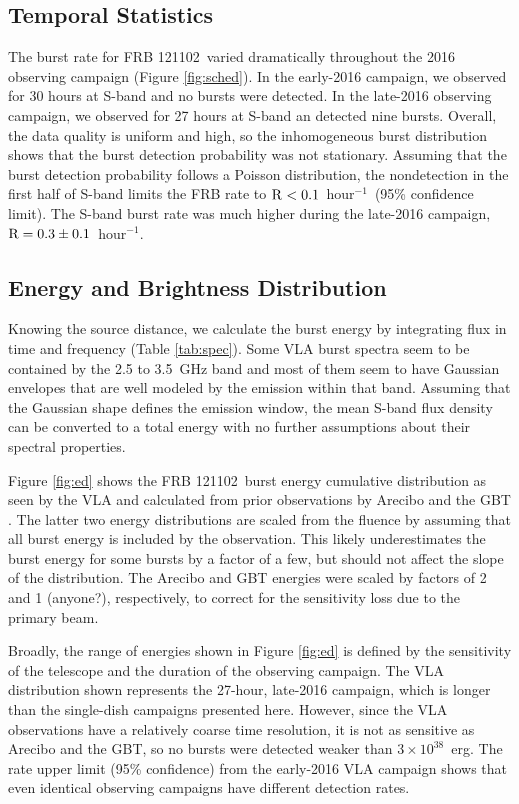 \documentclass[twocolumn]{aastex61}
\newcommand{\frb}{FRB 121102}
\begin{document}
\subsection{Temporal Statistics}
\label{sec:temp}

The burst rate for \frb\ varied dramatically throughout the 2016 observing campaign (Figure \ref{fig:sched}). In the early-2016 campaign, we observed for 30 hours at S-band and no bursts were detected. In the late-2016 observing campaign, we observed for 27 hours at S-band an detected nine bursts. Overall, the data quality is uniform and high, so the inhomogeneous burst distribution shows that the burst detection probability was not stationary. Assuming that the burst detection probability follows a Poisson distribution, the nondetection in the first half of S-band limits the FRB rate to $\rm{R}<0.1$\ hour$^{-1}$\ (95\% confidence limit). The S-band burst rate was much higher during the late-2016 campaign, $\rm{R}=0.3\pm0.1$\ hour$^{-1}$.

\subsection{Energy and Brightness Distribution}
\label{sec:disn}

Knowing the source distance, we calculate the burst energy by integrating flux in time and frequency (Table \ref{tab:spec}). Some VLA burst spectra seem to be contained by the 2.5 to 3.5~GHz band and most of them seem to have Gaussian envelopes that are well modeled by the emission within that band. Assuming that the Gaussian shape defines the emission window, the mean S-band flux density can be converted to a total energy with no further assumptions about their spectral properties.

Figure \ref{fig:ed} shows the \frb\ burst energy cumulative distribution as seen by the VLA and calculated from prior observations by Arecibo and the GBT \citep{2016Natur.531..202S,2016arXiv160308880S}. The latter two energy distributions are scaled from the fluence by assuming that all burst energy is included by the observation. This likely underestimates the burst energy for some bursts by a factor of a few, but should not affect the slope of the distribution. The Arecibo and GBT energies were scaled by factors of {\color{red} 2 and 1 (anyone?)}, respectively, to correct for the sensitivity loss due to the primary beam.

Broadly, the range of energies shown in Figure \ref{fig:ed} is defined by the sensitivity of the telescope and the duration of the observing campaign. The VLA distribution shown represents the 27-hour, late-2016 campaign, which is longer than the single-dish campaigns presented here. However, since the VLA observations have a relatively coarse time resolution, it is not as sensitive as Arecibo and the GBT, so no bursts were detected weaker than $3\times10^{38}$~erg. The rate upper limit (95\% confidence) from the early-2016 VLA campaign shows that even identical observing campaigns have different detection rates.
\end{document}
